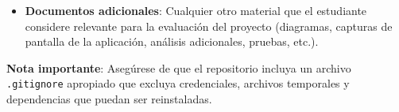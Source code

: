 \documentclass[10pt]{article}
\begin{document}
\begin{itemize}
		\item \textbf{Documentos adicionales}: Cualquier otro material que el estudiante considere relevante para la evaluación del proyecto (diagramas, capturas de pantalla de la aplicación, análisis adicionales, pruebas, etc.).
	\end{itemize}
	
	\vspace{2mm}
	
	\textbf{Nota importante}: Asegúrese de que el repositorio incluya un archivo \texttt{.gitignore} apropiado que excluya credenciales, archivos temporales y dependencias que puedan ser reinstaladas.
	
\end{document}

